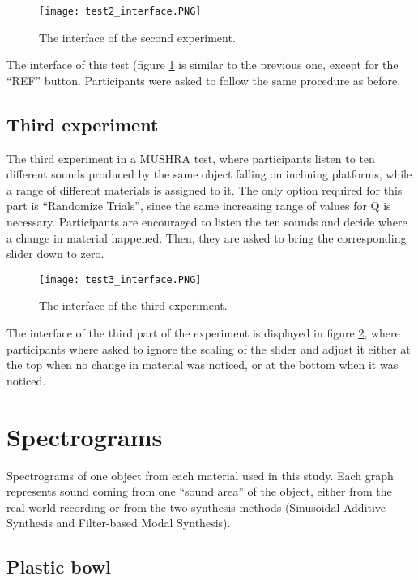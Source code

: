 \begin{figure}[H]
    \centering  
     \texttt{[image: test2\_interface.PNG]}
        \caption{The interface of the second experiment.}
        \label{fig:t2_ui}
\end{figure}

The interface of this test (figure \ref{fig:t2_ui} is similar to the previous one, except for the ``REF'' button. Participants were asked to follow the same procedure as before.

\section*{Third experiment}
The third experiment in a \gls{MUSHRA} test, where participants listen to ten different sounds produced by the same object falling on inclining platforms, while a range of different materials is assigned to it. The only option required for this part is ``Randomize Trials'', since the same increasing range of values for \gls{Q} is necessary. Participants are encouraged to listen the ten sounds and decide where a change in material happened. Then, they are asked to bring the corresponding slider down to zero.

\begin{figure}[H]
    \centering  
     \texttt{[image: test3\_interface.PNG]}
        \caption{The interface of the third experiment.}
        \label{fig:t3_ui}
\end{figure}

The interface of the third part of the experiment is displayed in figure \ref{fig:t3_ui}, where participants where asked to ignore the scaling of the slider and adjust it either at the top when no change in material was noticed, or at the bottom when it was noticed.

\chapter{Spectrograms}\label{ap:spectrograms}
Spectrograms of one object from each material used in this study. Each graph represents sound coming from one ``sound area'' of the object, either from the real-world recording or from the two synthesis methods (Sinusoidal Additive Synthesis and Filter-based Modal Synthesis).
\section*{Plastic bowl}

